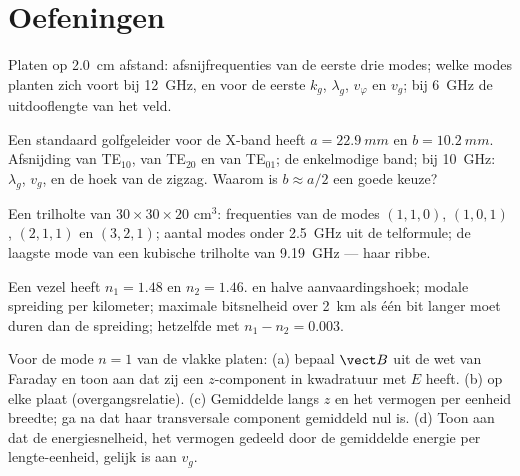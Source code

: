 \section{Oefeningen}

\begin{exercise}[$\star$]\label{exo:b2:guided-waves:1}
Platen op \qty{2.0}{cm} afstand: afsnijfrequenties van de eerste drie modes;
welke modes planten zich voort bij \qty{12}{GHz}, en voor de eerste $k_g$,
$\lambda_g$, $v_\varphi$ en $v_g$; bij \qty{6}{GHz} de uitdooflengte van het
veld.
\end{exercise}

\begin{exercise}[$\star$]\label{exo:b2:guided-waves:2}
Een standaard golfgeleider voor de X-band heeft $a = \qty{22.9}{mm}$ en
$b = \qty{10.2}{mm}$. Afsnijding van TE$_{10}$, van TE$_{20}$ en van
TE$_{01}$; de enkelmodige band; bij \qty{10}{GHz}: $\lambda_g$, $v_g$, en de
hoek van de zigzag. Waarom is $b \approx a/2$ een goede keuze?
\end{exercise}

\begin{exercise}[$\star$]\label{exo:b2:guided-waves:3}
Een trilholte van $30 \times 30 \times 20$ cm$^3$: frequenties van de modes
$(1,1,0)$, $(1,0,1)$, $(2,1,1)$ en $(3,2,1)$; aantal modes onder
\qty{2.5}{GHz} uit de telformule; de laagste mode van een kubische trilholte
van \qty{9.19}{GHz} --- haar ribbe.
\end{exercise}

\begin{exercise}[$\star$]\label{exo:b2:guided-waves:4}
Een vezel heeft $n_1 = 1.48$ en $n_2 = 1.46$.  en halve
aanvaardingshoek; modale spreiding per kilometer; maximale bitsnelheid over
\qty{2}{km} als één bit langer moet duren dan de spreiding; hetzelfde met
$n_1 - n_2 = 0.003$.
\end{exercise}

\begin{exercise}[$\star\star$]\label{exo:b2:guided-waves:5}
Voor de mode $n = 1$ van de vlakke platen: (a) bepaal $\vect B$ uit de wet
van Faraday en toon aan dat zij een $z$-component in kwadratuur met $E$
heeft. (b)  op elke plaat (overgangsrelatie). (c)
Gemiddelde  langs $z$ en het vermogen per eenheid breedte; ga
na dat haar transversale component gemiddeld nul is. (d) Toon aan dat de
energiesnelheid, het vermogen gedeeld door de gemiddelde energie per
lengte-eenheid, gelijk is aan $v_g$.
\end{exercise}

